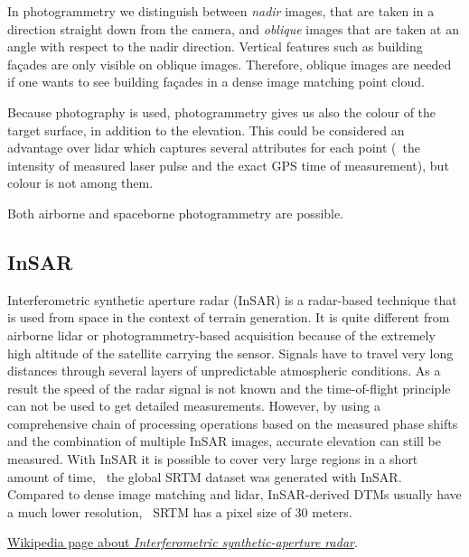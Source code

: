 In photogrammetry we distinguish between \emph{nadir} images, 
that are taken in a direction straight down from the camera, and \emph{oblique}
images that are taken at an angle with respect to the nadir direction.
Vertical features such as building façades are only visible on oblique images.
Therefore, oblique images are needed if one wants to see building façades in a dense image matching point cloud.

Because photography is used, photogrammetry gives us also the colour of the target surface, in addition to the elevation.
This could be considered an advantage over lidar which captures several attributes for each point (\eg\ the intensity of measured laser pulse and the exact GPS time of measurement), but colour is not among them.

Both airborne and spaceborne photogrammetry are possible.

\subsection{InSAR}

Interferometric synthetic aperture radar (InSAR) is a radar-based technique that is used from space in the context of terrain generation. 
It is quite different from airborne lidar or photo\-gramme\-try-based acquisition because of the extremely high altitude of the satellite carrying the sensor. 
Signals have to travel very long distances through several layers of unpredictable atmospheric conditions. 
As a result the speed of the radar signal is not known and the time-of-flight principle can not be used to get detailed measurements. 
However, by using a comprehensive chain of processing operations based on the measured phase shifts and the combination of multiple InSAR images, accurate elevation can still be measured. 
With InSAR it is possible to cover very large regions in a short amount of time, \eg\ the global SRTM dataset was generated with InSAR\@. 
Compared to dense image matching and lidar, InSAR-derived DTMs usually have a much lower resolution, \eg\ SRTM has a pixel size of 30 meters.

\begin{kaobox}[frametitle=\faExternalLink\ To read or to watch.]
	\href{https://en.wikipedia.org/wiki/Interferometric_synthetic-aperture_radar}{Wikipedia page about \emph{Interferometric synthetic-aperture radar}}.
\end{kaobox}


